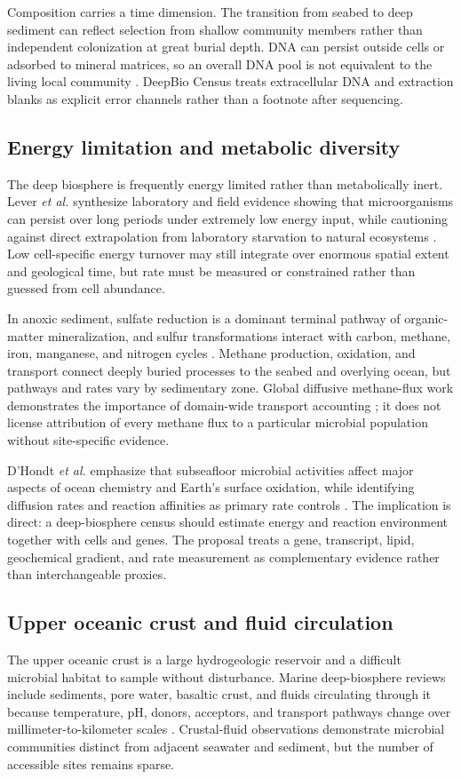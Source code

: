 \documentclass[conference]{../../../../Conference-LaTeX-template_10-17-19/IEEEtran}
\begin{document}
Composition carries a time dimension. The transition from seabed to deep sediment can reflect selection from shallow community members rather than independent colonization at great burial depth. DNA can persist outside cells or adsorbed to mineral matrices, so an overall DNA pool is not equivalent to the living local community \cite{torti2015}. DeepBio Census treats extracellular DNA and extraction blanks as explicit error channels rather than a footnote after sequencing.

\subsection{Energy limitation and metabolic diversity}
The deep biosphere is frequently energy limited rather than metabolically inert. Lever \textit{et al.} synthesize laboratory and field evidence showing that microorganisms can persist over long periods under extremely low energy input, while cautioning against direct extrapolation from laboratory starvation to natural ecosystems \cite{lever2015}. Low cell-specific energy turnover may still integrate over enormous spatial extent and geological time, but rate must be measured or constrained rather than guessed from cell abundance.

In anoxic sediment, sulfate reduction is a dominant terminal pathway of organic-matter mineralization, and sulfur transformations interact with carbon, methane, iron, manganese, and nitrogen cycles \cite{wasmund2017}. Methane production, oxidation, and transport connect deeply buried processes to the seabed and overlying ocean, but pathways and rates vary by sedimentary zone. Global diffusive methane-flux work demonstrates the importance of domain-wide transport accounting \cite{egger2018}; it does not license attribution of every methane flux to a particular microbial population without site-specific evidence.

D'Hondt \textit{et al.} emphasize that subseafloor microbial activities affect major aspects of ocean chemistry and Earth's surface oxidation, while identifying diffusion rates and reaction affinities as primary rate controls \cite{dhondt2019}. The implication is direct: a deep-biosphere census should estimate energy and reaction environment together with cells and genes. The proposal treats a gene, transcript, lipid, geochemical gradient, and rate measurement as complementary evidence rather than interchangeable proxies.

\subsection{Upper oceanic crust and fluid circulation}
The upper oceanic crust is a large hydrogeologic reservoir and a difficult microbial habitat to sample without disturbance. Marine deep-biosphere reviews include sediments, pore water, basaltic crust, and fluids circulating through it because temperature, pH, donors, acceptors, and transport pathways change over millimeter-to-kilometer scales \cite{orcutt2013}. Crustal-fluid observations demonstrate microbial communities distinct from adjacent seawater and sediment, but the number of accessible sites remains sparse.
\end{document}
